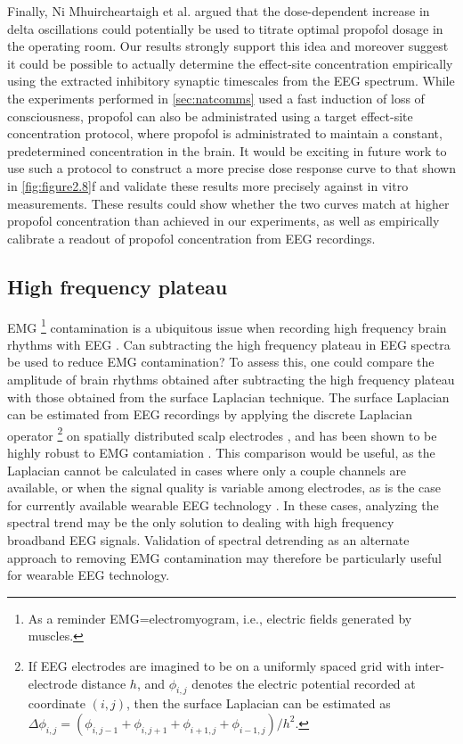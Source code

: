 Finally, Ni Mhuircheartaigh et al. \cite{NiMhuircheartaigh2013} argued that the dose-dependent increase in delta oscillations could potentially be used to titrate optimal propofol dosage in the operating room. Our results strongly support this idea and moreover suggest it could be possible to actually determine the effect-site concentration empirically using the extracted inhibitory synaptic timescales from the EEG spectrum. While the experiments performed in \autoref{sec:natcomms} used a fast induction of loss of consciousness, propofol can also be administrated using a target effect-site concentration protocol, where propofol is administrated to maintain a constant, predetermined concentration in the brain. It would be exciting in future work to use such a protocol to construct a more precise dose response curve to that shown in \autoref{fig:figure2.8}f and validate these results more precisely against in vitro measurements. These results could show whether the two curves match at higher propofol concentration than achieved in our experiments, as well as empirically calibrate a readout of propofol concentration from EEG recordings.

\subsection{High frequency plateau}
EMG \footnote[2]{As a reminder EMG=electromyogram, i.e., electric fields generated by muscles.} contamination is a ubiquitous issue when recording high frequency brain rhythms with EEG \cite{Muthukumaraswamy2013}. Can subtracting the high frequency plateau in EEG spectra be used to reduce EMG contamination? To assess this, one could compare the amplitude of brain rhythms obtained after subtracting the high frequency plateau with those obtained from the surface Laplacian technique. The surface Laplacian can be estimated from EEG recordings by applying the discrete Laplacian operator \footnote[3]{If EEG electrodes are imagined to be on a uniformly spaced grid with inter-electrode distance $h$, and $\phi_{i,j}$ denotes the electric potential recorded at coordinate $(i,j)$, then the surface Laplacian can be estimated as $\Delta\phi_{i,j} = (\phi_{i,j-1}+\phi_{i,j+1}+\phi_{i+1,j}+\phi_{i-1,j})/h^2$.} on spatially distributed scalp electrodes \cite{Carvalhaes2015}, and has been shown to be highly robust to EMG contamiation \cite{Fitzgibbon2013}. This comparison would be useful, as the Laplacian cannot be calculated in cases where only a couple channels are available, or when the signal quality is variable among electrodes, as is the case for currently available wearable EEG technology \cite{Mihajlovic2015}. In these cases, analyzing the spectral trend may be the only solution to dealing with high frequency broadband EEG signals. Validation of spectral detrending as an alternate approach to removing EMG contamination may therefore be particularly useful for wearable EEG technology.

